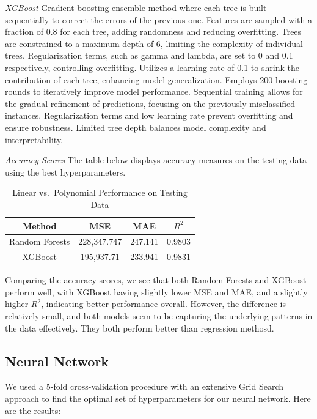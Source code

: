 \documentclass[conference]{IEEEtran}
\begin{document}
\emph{XGBoost} Gradient boosting ensemble method where each tree is built sequentially to correct the errors of the previous one. Features are sampled with a fraction of 0.8 for each tree, adding randomness and reducing overfitting. Trees are constrained to a maximum depth of 6, limiting the complexity of individual trees. Regularization terms, such as gamma and lambda, are set to 0 and 0.1 respectively, controlling overfitting. Utilizes a learning rate of 0.1 to shrink the contribution of each tree, enhancing model generalization.
Employs 200 boosting rounds to iteratively improve model performance. Sequential training allows for the gradual refinement of predictions, focusing on the previously misclassified instances. Regularization terms and low learning rate prevent overfitting and ensure robustness. Limited tree depth balances model complexity and interpretability.

\emph{Accuracy Scores} The table below displays accuracy measures on the testing data using the best hyperparameters. 

\begin{table}[H]
\centering
\caption{Linear vs.\ Polynomial Performance on Testing Data}
\begin{tabular}{|c|c|c|c|}
\hline
Method & MSE & MAE & $R^2$ \\
\hline
Random Forests & 228,347.747 & 247.141 & 0.9803 \\
\hline
XGBoost & 195,937.71 & 233.941 & 0.9831 \\
\hline
\end{tabular}
\label{tab:mytable}
\end{table}

Comparing the accuracy scores, we see that both Random Forests and XGBoost perform well, with XGBoost having slightly lower MSE and MAE, and a slightly higher $R^2$, indicating better performance overall. However, the difference is relatively small, and both models seem to be capturing the underlying patterns in the data effectively. They both perform better than regression methosd. 

\subsection{Neural Network}

We used a 5-fold cross-validation procedure with an extensive Grid Search approach to find the optimal set of hyperparameters for our neural network. Here are the results:
\end{document}
